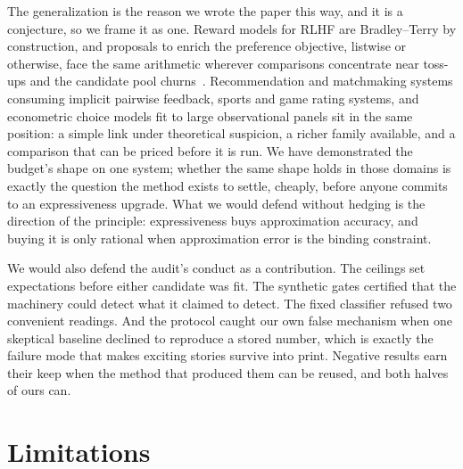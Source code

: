 \documentclass[10pt]{article}
\begin{document}
The generalization is the reason we wrote the paper this way, and it
is a conjecture, so we frame it as one. Reward models for RLHF are
Bradley--Terry by construction, and proposals to enrich the preference
objective, listwise or otherwise, face the same arithmetic wherever
comparisons concentrate near toss-ups and the candidate pool
churns~\citep{liu2024lipo}. Recommendation and matchmaking systems
consuming implicit pairwise feedback, sports and game rating systems,
and econometric choice models fit to large observational panels sit in
the same position: a simple link under theoretical suspicion, a richer
family available, and a comparison that can be priced before it is
run. We have demonstrated the budget's shape on one system; whether
the same shape holds in those domains is exactly the question the
method exists to settle, cheaply, before anyone commits to an
expressiveness upgrade. What we would defend without hedging is the
direction of the principle: expressiveness buys approximation
accuracy, and buying it is only rational when approximation error is
the binding constraint.

We would also defend the audit's conduct as a contribution. The
ceilings set expectations before either candidate was fit. The synthetic gates
certified that the machinery could detect what it claimed to detect.
The fixed classifier refused two convenient readings. And the
protocol caught our own false mechanism when one skeptical baseline
declined to reproduce a stored number, which is exactly the failure
mode that makes exciting stories survive into print. Negative
results earn their keep when the method that produced them can be
reused, and both halves of ours can.

\section{Limitations}\label{sec:limits}
\end{document}
